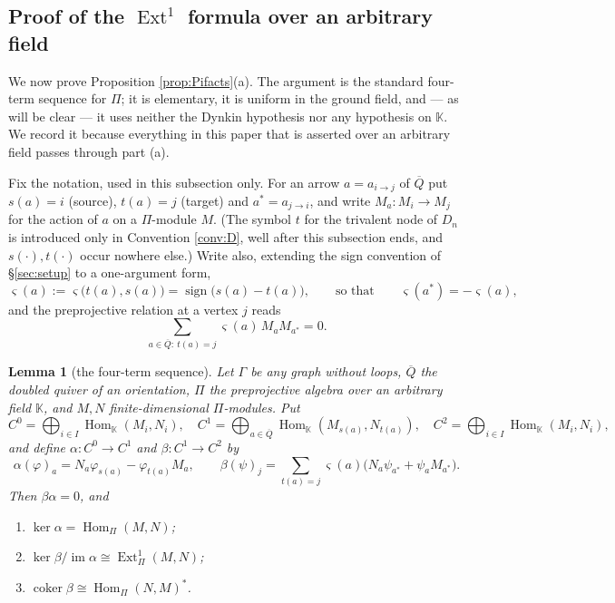 \documentclass[reqno]{amsart}
\theoremstyle{plain}
\newtheorem{lemma}[theorem]{Lemma}
\theoremstyle{definition}
\DeclareMathOperator{\Hom}{Hom}
\DeclareMathOperator{\Ext}{Ext}
\DeclareMathOperator{\im}{im}
\newcommand{\al}{\alpha}
\newcommand{\Pia}{\Pi}
\begin{document}
\subsection{Proof of the \texorpdfstring{$\Ext^1$}{Ext1} formula over an
arbitrary field}\label{ss:cbproof}

We now prove Proposition \ref{prop:Pifacts}(a).  The argument is the standard
four-term sequence for $\Pia$; it is elementary, it is uniform in the ground
field, and --- as will be clear --- it uses neither the Dynkin hypothesis nor
any hypothesis on $\mathbb{K}$.  We record it because everything in this paper
that is asserted over an arbitrary field passes through part \textup{(a)}.

Fix the notation, used in this subsection only.  For an arrow
$a=a_{i\to j}$ of $\overline{Q}$ put $s(a)=i$ (source), $t(a)=j$ (target) and
$a^{*}=a_{j\to i}$, and write $M_a:M_i\to M_j$ for the action of $a$ on a
$\Pia$-module $M$.  (The symbol $t$ for the trivalent node of $D_n$ is
introduced only in Convention \ref{conv:D}, well after this subsection ends,
and $s(\cdot),t(\cdot)$ occur nowhere else.)  Write also, extending the sign
convention of \S\ref{sec:setup} to a one-argument form,
\[
   \varsigma(a):=\varsigma\bigl(t(a),s(a)\bigr)=\operatorname{sign}\bigl(s(a)-t(a)\bigr),
   \qquad\text{so that}\qquad \varsigma(a^{*})=-\varsigma(a),
\]
and the preprojective relation at a vertex $j$ reads
\begin{equation}\label{eq:relj}
   \sum_{a\in\overline{Q}:\ t(a)=j}\varsigma(a)\,M_aM_{a^{*}}=0 .
\end{equation}

\begin{lemma}[the four-term sequence]\label{lem:cbseq}
Let $\Gamma$ be any graph without loops, $\overline{Q}$ the doubled quiver of
an orientation, $\Pia$ the preprojective algebra over an arbitrary field
$\mathbb{K}$, and $M,N$ finite-dimensional $\Pia$-modules.  Put
\[
   C^{0}=\bigoplus_{i\in I}\Hom_{\mathbb{K}}(M_i,N_i),\quad
   C^{1}=\bigoplus_{a\in\overline{Q}}\Hom_{\mathbb{K}}(M_{s(a)},N_{t(a)}),\quad
   C^{2}=\bigoplus_{i\in I}\Hom_{\mathbb{K}}(M_i,N_i),
\]
and define $\al:C^0\to C^1$ and $\beta:C^1\to C^2$ by
\[
   \al(\varphi)_a=N_a\varphi_{s(a)}-\varphi_{t(a)}M_a,
   \qquad
   \beta(\psi)_j=\sum_{t(a)=j}\varsigma(a)\bigl(N_a\psi_{a^{*}}+\psi_aM_{a^{*}}\bigr).
\]
Then $\beta\al=0$, and
\begin{enumerate}
\item[\textup{(i)}] $\ker\al=\Hom_\Pia(M,N)$;
\item[\textup{(ii)}] $\ker\beta/\im\al\cong\Ext^1_\Pia(M,N)$;
\item[\textup{(iii)}] $\operatorname{coker}\beta\cong\Hom_\Pia(N,M)^{*}$.
\end{enumerate}
\end{lemma}
\end{document}

